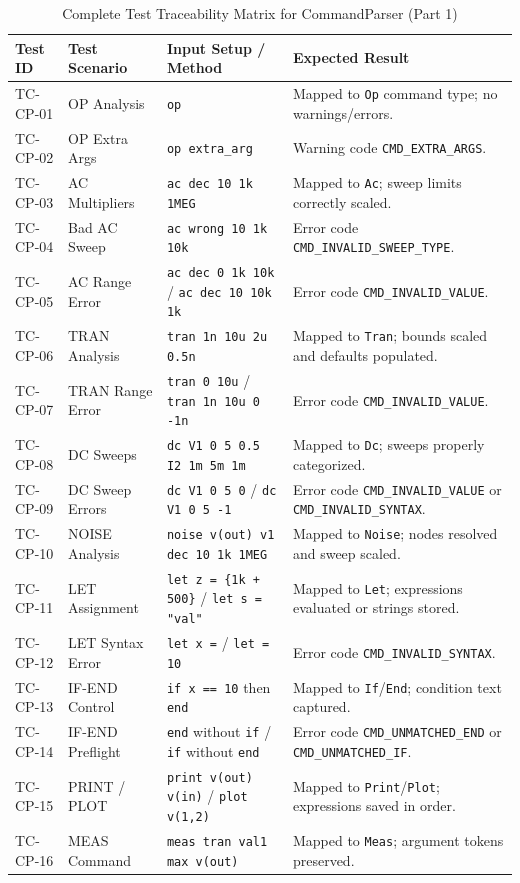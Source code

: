 \begin{table}[H]
\centering
\small
\begin{tabular}{|l|l|p{4.5cm}|p{4.5cm}|}
\hline
\textbf{Test ID} & \textbf{Test Scenario} & \textbf{Input Setup / Method} & \textbf{Expected Result} \\
\hline
TC-CP-01 & OP Analysis & \texttt{op} & Mapped to \texttt{Op} command type; no warnings/errors. \\
\hline
TC-CP-02 & OP Extra Args & \texttt{op extra\_arg} & Warning code \texttt{CMD\_EXTRA\_ARGS}. \\
\hline
TC-CP-03 & AC Multipliers & \texttt{ac dec 10 1k 1MEG} & Mapped to \texttt{Ac}; sweep limits correctly scaled. \\
\hline
TC-CP-04 & Bad AC Sweep & \texttt{ac wrong 10 1k 10k} & Error code \texttt{CMD\_INVALID\_SWEEP\_TYPE}. \\
\hline
TC-CP-05 & AC Range Error & \texttt{ac dec 0 1k 10k} / \texttt{ac dec 10 10k 1k} & Error code \texttt{CMD\_INVALID\_VALUE}. \\
\hline
TC-CP-06 & TRAN Analysis & \texttt{tran 1n 10u 2u 0.5n} & Mapped to \texttt{Tran}; bounds scaled and defaults populated. \\
\hline
TC-CP-07 & TRAN Range Error & \texttt{tran 0 10u} / \texttt{tran 1n 10u 0 -1n} & Error code \texttt{CMD\_INVALID\_VALUE}. \\
\hline
TC-CP-08 & DC Sweeps & \texttt{dc V1 0 5 0.5 I2 1m 5m 1m} & Mapped to \texttt{Dc}; sweeps properly categorized. \\
\hline
TC-CP-09 & DC Sweep Errors & \texttt{dc V1 0 5 0} / \texttt{dc V1 0 5 -1} & Error code \texttt{CMD\_INVALID\_VALUE} or \texttt{CMD\_INVALID\_SYNTAX}. \\
\hline
TC-CP-10 & NOISE Analysis & \texttt{noise v(out) v1 dec 10 1k 1MEG} & Mapped to \texttt{Noise}; nodes resolved and sweep scaled. \\
\hline
TC-CP-11 & LET Assignment & \texttt{let z = \{1k + 500\}} / \texttt{let s = "val"} & Mapped to \texttt{Let}; expressions evaluated or strings stored. \\
\hline
TC-CP-12 & LET Syntax Error & \texttt{let x =} / \texttt{let = 10} & Error code \texttt{CMD\_INVALID\_SYNTAX}. \\
\hline
TC-CP-13 & IF-END Control & \texttt{if x == 10} then \texttt{end} & Mapped to \texttt{If}/\texttt{End}; condition text captured. \\
\hline
TC-CP-14 & IF-END Preflight & \texttt{end} without \texttt{if} / \texttt{if} without \texttt{end} & Error code \texttt{CMD\_UNMATCHED\_END} or \texttt{CMD\_UNMATCHED\_IF}. \\
\hline
TC-CP-15 & PRINT / PLOT & \texttt{print v(out) v(in)} / \texttt{plot v(1,2)} & Mapped to \texttt{Print}/\texttt{Plot}; expressions saved in order. \\
\hline
TC-CP-16 & MEAS Command & \texttt{meas tran val1 max v(out)} & Mapped to \texttt{Meas}; argument tokens preserved. \\
\hline
\end{tabular}
\caption{Complete Test Traceability Matrix for CommandParser (Part 1)}
\end{table}

